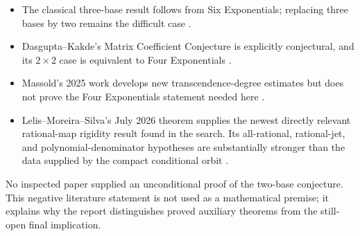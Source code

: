 \documentclass[11pt]{article}
\theoremstyle{definition}
\theoremstyle{remark}
\begin{document}
\begin{itemize}[leftmargin=2em]
\item The classical three-base result follows from Six Exponentials; replacing three bases
      by two remains the difficult case \cite{SenthilKumarEtAl2018}.
\item Dasgupta--Kakde's Matrix Coefficient Conjecture is explicitly conjectural, and its
      $2\times2$ case is equivalent to Four Exponentials
      \cite{DasguptaKakde2024}.
\item Massold's 2025 work develops new transcendence-degree estimates but does not prove the
      Four Exponentials statement needed here \cite{Massold2025}.
\item Lelis--Moreira--Silva's July 2026 theorem supplies the newest directly relevant
      rational-map rigidity result found in the search.  Its all-rational, rational-jet, and
      polynomial-denominator hypotheses are substantially stronger than the data supplied by
      the compact conditional orbit \cite{LelisMoreiraSilva2026}.
\end{itemize}

No inspected paper supplied an unconditional proof of the two-base conjecture.  This
negative literature statement is not used as a mathematical premise; it explains why the
report distinguishes proved auxiliary theorems from the still-open final implication.
\end{document}
